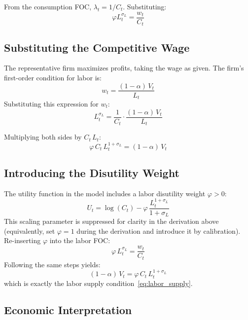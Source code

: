 \documentclass[12pt, a4paper]{article}
\begin{document}
From the consumption FOC, $\lambda_t = 1/C_t$. Substituting:
\begin{equation*}
\varphi L_t^{\sigma_L} = \frac{w_t}{C_t}
\end{equation*}

\subsection*{Substituting the Competitive Wage}

The representative firm maximizes profits, taking the wage as given. The firm's first-order condition for labor is:
\begin{equation*}
w_t = \frac{(1-\alpha)\,V_t}{L_t}
\end{equation*}
Substituting this expression for $w_t$:
\begin{equation*}
L_t^{\sigma_L} = \frac{1}{C_t} \cdot \frac{(1-\alpha)\,V_t}{L_t}
\end{equation*}

Multiplying both sides by $C_t \, L_t$:
\begin{equation*}
\varphi \, C_t \, L_t^{1+\sigma_L} = (1-\alpha)\,V_t
\end{equation*}

\subsection*{Introducing the Disutility Weight}

The utility function in the model includes a labor disutility weight $\varphi > 0$:
\begin{equation*}
U_t = \log(C_t) - \varphi\,\frac{L_t^{1+\sigma_L}}{1+\sigma_L}
\end{equation*}
This scaling parameter is suppressed for clarity in the derivation above (equivalently, set $\varphi = 1$ during the derivation and introduce it by calibration). Re-inserting $\varphi$ into the labor FOC:
\begin{equation*}
\varphi\, L_t^{\sigma_L} = \frac{w_t}{C_t}
\end{equation*}
Following the same steps yields:
\begin{equation*}
(1-\alpha)\,V_t = \varphi\,C_t\,L_t^{1+\sigma_L}
\end{equation*}
which is exactly the labor supply condition~\eqref{eq:labor_supply}.

\subsection*{Economic Interpretation}
\end{document}
